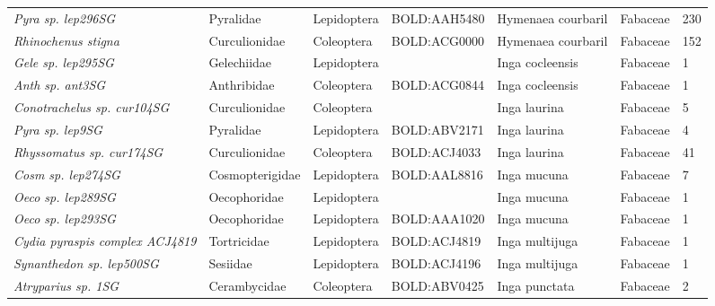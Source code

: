 \documentclass[11pt]{article}
\begin{document}
\begin{landscape}
\begin{longtable}{@{}lllllll@{}}
\textit{Pyra sp. lep296SG}                            & Pyralidae       & Lepidoptera  & BOLD:AAH5480 & Hymenaea courbaril                 & Fabaceae         & 230   \\
\textit{Rhinochenus stigna}                           & Curculionidae   & Coleoptera   & BOLD:ACG0000 & Hymenaea courbaril                 & Fabaceae         & 152   \\
\textit{Gele sp. lep295SG}                            & Gelechiidae     & Lepidoptera  &              & Inga cocleensis                    & Fabaceae         & 1     \\
\textit{Anth sp. ant3SG}                              & Anthribidae     & Coleoptera   & BOLD:ACG0844 & Inga cocleensis                    & Fabaceae         & 1     \\
\textit{Conotrachelus sp. cur104SG}                   & Curculionidae   & Coleoptera   &              & Inga laurina                       & Fabaceae         & 5     \\
\textit{Pyra sp. lep9SG}                              & Pyralidae       & Lepidoptera  & BOLD:ABV2171 & Inga laurina                       & Fabaceae         & 4     \\
\textit{Rhyssomatus sp. cur174SG}                     & Curculionidae   & Coleoptera   & BOLD:ACJ4033 & Inga laurina                       & Fabaceae         & 41    \\
\textit{Cosm sp. lep274SG}                            & Cosmopterigidae & Lepidoptera  & BOLD:AAL8816 & Inga mucuna                        & Fabaceae         & 7     \\
\textit{Oeco sp. lep289SG}                            & Oecophoridae    & Lepidoptera  &              & Inga mucuna                        & Fabaceae         & 1     \\
\textit{Oeco sp. lep293SG}                            & Oecophoridae    & Lepidoptera  & BOLD:AAA1020 & Inga mucuna                        & Fabaceae         & 1     \\
\textit{Cydia pyraspis complex ACJ4819}               & Tortricidae     & Lepidoptera  & BOLD:ACJ4819 & Inga multijuga                     & Fabaceae         & 1     \\
\textit{Synanthedon sp. lep500SG}                     & Sesiidae        & Lepidoptera  & BOLD:ACJ4196 & Inga multijuga                     & Fabaceae         & 1     \\
\textit{Atryparius sp. 1SG}                           & Cerambycidae    & Coleoptera   & BOLD:ABV0425 & Inga punctata                      & Fabaceae         & 2     \\

\end{longtable}
\end{landscape}
\end{document}
